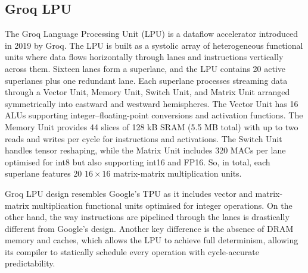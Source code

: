 \subsection{Groq LPU}

The Groq Language Processing Unit (LPU) \cite{Gwennap, Abts2022} is a dataflow accelerator introduced in 2019 by Groq.
The LPU is built as a systolic array of heterogeneous functional units where data flows horizontally through lanes and instructions vertically across them. Sixteen lanes form a superlane, and the LPU contains 20 active superlanes plus one redundant lane. Each superlane processes streaming data through a Vector Unit, Memory Unit, Switch Unit, and Matrix Unit arranged symmetrically into eastward and westward hemispheres. The Vector Unit has 16 ALUs supporting integer–floating-point conversions and activation functions. The Memory Unit provides 44 slices of 128 kB SRAM (5.5 MB total) with up to two reads and writes per cycle for instructions and activations. The Switch Unit handles tensor reshaping, while the Matrix Unit includes 320 MACs per lane optimised for int8 but also supporting int16 and FP16. So, in total, each superlane features 20 $16\times 16$ matrix-matrix multiplication units.

Groq LPU design resembles Google's TPU as it includes vector and matrix-matrix multiplication functional units optimised for integer operations. On the other hand, the way instructions are pipelined through the lanes is drastically different from Google's design. Another key difference is the absence of DRAM memory and caches, which allows the LPU to achieve full determinism, allowing its compiler to statically schedule every operation with cycle-accurate predictability.
